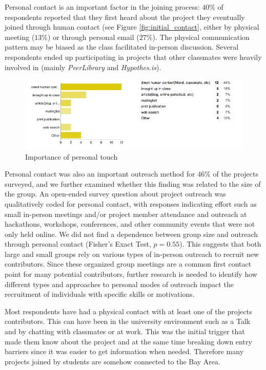 Personal contact is an important factor in the joining process: $40\%$ of respondents reported that they first heard about the project they eventually joined through human contact (see Figure \ref{fig:initial_contact}, either by physical meeting ($13\%$) or through personal email ($27\%$). The physical communication pattern may be biased as the class facilitated in-person discussion. Several respondents ended up participating in projects that other classmates were heavily involved in (mainly {\it PeerLibrary} and {\it Hypothes.is}). 

\begin{figure}[ht!]
\centering
\includegraphics[width=120mm]{chapters/img/importance_of_personal_touch.png}
\caption{Importance of personal touch}
\label{fig:personal_touch}
\end{figure}

Personal contact was also an important outreach method for 46\% of the projects surveyed, and we further examined whether this finding was related to the size of the group. An open-ended survey question about project outreach was qualitatively coded for personal contact, with responses indicating effort such as small in-person meetings and/or project member attendance and outreach at hackathons, workshops, conferences, and other community events that were not only held online. We did not find a dependence between group size and outreach through personal contact (Fisher's Exact Test, $p = 0.55$). This suggests that both large and small groups rely on various types of in-person outreach to recruit new contributors. Since these organized group meetings are a common first contact point for many potential contributors, further research is needed to identify how different types and approaches to personal modes of outreach impact the recruitment of individuals with specific skills or motivations.

Most respondents have had a physical contact with at least one of the projects contributors. This can have been in the university environment such as a Talk and by chatting with classmates or at work. This was the initial trigger that made them know about the project and at the same time breaking down entry barriers since it was easier to get information when needed. Therefore many projects joined by students are somehow connected to the Bay Area.